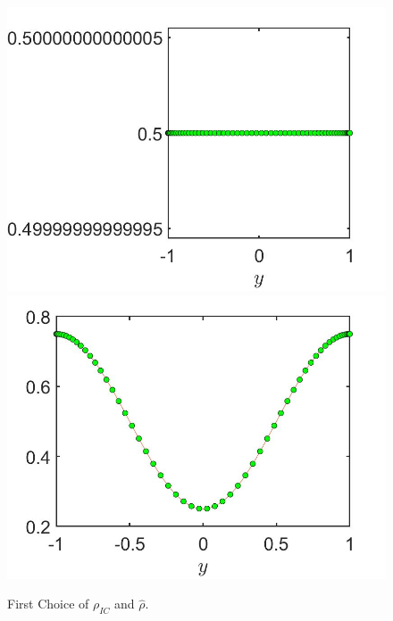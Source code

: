 \documentclass[11pt, a4paper]{article}
\theoremstyle{definition}
\begin{document}
\begin{figure}[h]
	\includegraphics[scale=0.3]{rhoIC1.jpg}
	\includegraphics[scale=0.3]{rhoHat1.jpg}
	\caption{First Choice of $\rho_{IC}$ and $\hat \rho$.}
	\label{rhoTarget1}
\end{figure}
\end{document}

